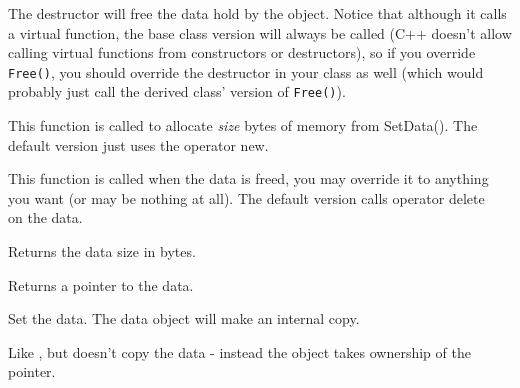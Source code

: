 \label{wxcustomdataobjectdtor}


The destructor will free the data hold by the object. Notice that although it
calls a virtual  function, the base
class version will always be called (C++ doesn't allow calling virtual
functions from constructors or destructors), so if you override {\tt Free()}, you
should override the destructor in your class as well (which would probably
just call the derived class' version of {\tt Free()}).

\label{wxcustomdataobjectalloc}


This function is called to allocate {\it size} bytes of memory from SetData().
The default version just uses the operator new.

\label{wxcustomdataobjectfree}


This function is called when the data is freed, you may override it to anything
you want (or may be nothing at all). The default version calls operator
delete\[\] on the data.

\label{wxcustomdataobjectgetsize}


Returns the data size in bytes.

\label{wxcustomdataobjectgetdata}


Returns a pointer to the data.

\label{wxcustomdataobjectsetdata}


Set the data. The data object will make an internal copy.

\label{wxcustomdataobjecttakedata}


Like , but doesn't copy the data -
instead the object takes ownership of the pointer.
